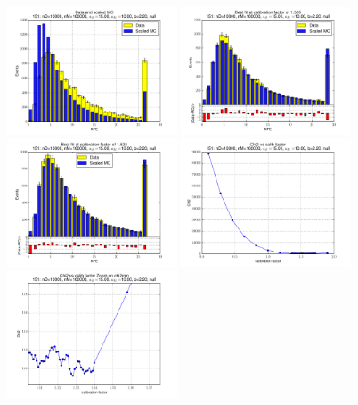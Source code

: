 
 \begin{figure}[htbp] \begin{center} 
\includegraphics[width=0.45\textwidth]{../FIGURES/151/FIG_Data_and_scaled_MC.pdf} 
\includegraphics[width=0.45\textwidth]{../FIGURES/151/FIG_Best_fit_at_calibration_factor_of_1_520.pdf} 
\includegraphics[width=0.45\textwidth]{../FIGURES/151/FIG_Best_fit_at_calibration_factor_of_1_528.pdf} 
\includegraphics[width=0.45\textwidth]{../FIGURES/151/FIG_Chi2_vs_calib_factor.pdf} 
\includegraphics[width=0.45\textwidth]{../FIGURES/151/FIG_Chi2_vs_calib_factor_Zoom_on_chi2min.pdf} 

\end{center}
\end{figure}
